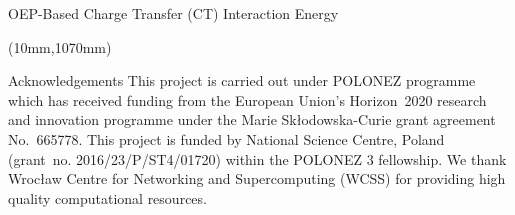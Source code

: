 \documentclass[final]{beamer} %
\begin{document}
\begin{frame}{OEP-Based Charge Transfer (CT) Interaction Energy}
%
%
%
\begin{textblock*}{820mm}(10mm,1070mm)
\begin{block}{Acknowledgements}
 This project is carried out under POLONEZ programme which has received funding from the European Union's
 Horizon~2020 research and innovation programme under the Marie Sk{\l}odowska-Curie grant agreement 
 No.~665778. This project is funded by National Science Centre, Poland 
 (grant~no. 2016/23/P/ST4/01720) within the POLONEZ 3 fellowship.
 We thank
 Wroc{\l}aw Centre for Networking and Supercomputing (WCSS) for
 providing high quality computational resources.
\end{block}
\end{textblock*}


\end{frame}
\end{document}
